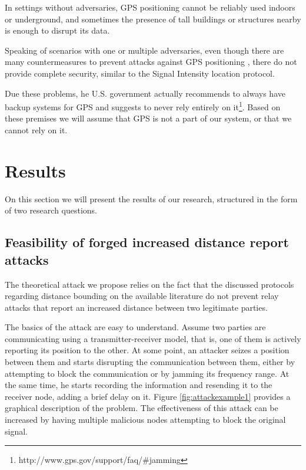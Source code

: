 \documentclass{article}
\begin{document}
In settings without adversaries, GPS positioning cannot be reliably used indoors or underground, and sometimes the presence of tall buildings or structures nearby is enough to disrupt its data.

Speaking of scenarios with one or multiple adversaries, even though there are many countermeasures to prevent attacks against GPS positioning \cite{warner2003gps, wen2005countermeasures, jafarnia2012gps}, there do not provide complete security, similar to the Signal Intensity location protocol.

Due these problems, he U.S. government actually recommends to always have backup systems for GPS and suggests to never rely entirely on it\footnote{http://www.gps.gov/support/faq/\#jamming}. Based on these premises we will assume that GPS is not a part of our system, or that we cannot rely on it.

\section{Results}

On this section we will present the results of our research, structured in the form of two research questions.

\subsection{Feasibility of forged increased distance report attacks}

The theoretical attack we propose relies on the fact that the discussed protocols regarding distance bounding on the available literature do not prevent relay attacks that report an increased distance between two legitimate parties.

The basics of the attack are easy to understand. Assume two parties are communicating using a transmitter-receiver model, that is, one of them is actively reporting its position to the other. At some point, an attacker seizes a position between them and starts disrupting the communication between them, either by attempting to block the communication or by jamming its frequency range. At the same time, he starts recording the information and resending it to the receiver node, adding a brief delay on it. Figure \ref{fig:attackexample1} provides a graphical description of the problem. The effectiveness of this attack can be increased by having multiple malicious nodes attempting to block the original signal.
\end{document}
